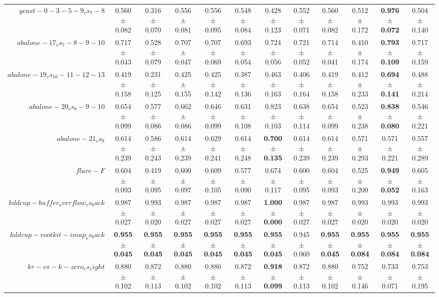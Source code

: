 \begin{table}[!ht]
{\begin{tabular}{r c c c c c c c c c c c}
$yeast-0-3-5-9_vs_7-8$ & 0.560 $\pm$ 0.082 & 0.316 $\pm$ 0.070 & 0.556 $\pm$ 0.081 & 0.556 $\pm$ 0.095 & 0.548 $\pm$ 0.084 & 0.428 $\pm$ 0.123 & 0.552 $\pm$ 0.071 & 0.560 $\pm$ 0.082 & 0.512 $\pm$ 0.172 & \textbf{0.976 $\pm$ 0.072} & 0.504 $\pm$ 0.140 \\
$abalone-17_vs_7-8-9-10$ & 0.717 $\pm$ 0.043 & 0.528 $\pm$ 0.079 & 0.707 $\pm$ 0.047 & 0.707 $\pm$ 0.069 & 0.693 $\pm$ 0.054 & 0.724 $\pm$ 0.056 & 0.721 $\pm$ 0.052 & 0.714 $\pm$ 0.041 & 0.410 $\pm$ 0.174 & \textbf{0.793 $\pm$ 0.109} & 0.717 $\pm$ 0.159 \\
$abalone-19_vs_10-11-12-13$ & 0.419 $\pm$ 0.158 & 0.231 $\pm$ 0.125 & 0.425 $\pm$ 0.155 & 0.425 $\pm$ 0.142 & 0.387 $\pm$ 0.136 & 0.463 $\pm$ 0.163 & 0.406 $\pm$ 0.164 & 0.419 $\pm$ 0.158 & 0.412 $\pm$ 0.233 & \textbf{0.694 $\pm$ 0.141} & 0.488 $\pm$ 0.214 \\
$abalone-20_vs_8-9-10$ & 0.654 $\pm$ 0.099 & 0.577 $\pm$ 0.086 & 0.662 $\pm$ 0.086 & 0.646 $\pm$ 0.099 & 0.631 $\pm$ 0.108 & 0.823 $\pm$ 0.103 & 0.638 $\pm$ 0.114 & 0.654 $\pm$ 0.099 & 0.523 $\pm$ 0.238 & \textbf{0.838 $\pm$ 0.080} & 0.546 $\pm$ 0.221 \\
$abalone-21_vs_8$ & 0.614 $\pm$ 0.239 & 0.586 $\pm$ 0.243 & 0.614 $\pm$ 0.239 & 0.629 $\pm$ 0.241 & 0.614 $\pm$ 0.248 & \textbf{0.700 $\pm$ 0.135} & 0.614 $\pm$ 0.239 & 0.614 $\pm$ 0.239 & 0.571 $\pm$ 0.293 & 0.571 $\pm$ 0.221 & 0.557 $\pm$ 0.289 \\
$flare-F$ & 0.604 $\pm$ 0.093 & 0.419 $\pm$ 0.095 & 0.600 $\pm$ 0.097 & 0.609 $\pm$ 0.105 & 0.577 $\pm$ 0.090 & 0.674 $\pm$ 0.117 & 0.600 $\pm$ 0.095 & 0.604 $\pm$ 0.093 & 0.525 $\pm$ 0.200 & \textbf{0.949 $\pm$ 0.052} & 0.605 $\pm$ 0.163 \\
$kddcup-buffer_overflow_vs_back$ & 0.987 $\pm$ 0.027 & 0.993 $\pm$ 0.020 & 0.987 $\pm$ 0.027 & 0.987 $\pm$ 0.027 & 0.987 $\pm$ 0.027 & \textbf{1.000 $\pm$ 0.000} & 0.987 $\pm$ 0.027 & 0.987 $\pm$ 0.027 & 0.993 $\pm$ 0.020 & 0.993 $\pm$ 0.020 & 0.993 $\pm$ 0.020 \\
$kddcup-rootkit-imap_vs_back$ & \textbf{0.955 $\pm$ 0.045} & \textbf{0.955 $\pm$ 0.045} & \textbf{0.955 $\pm$ 0.045} & \textbf{0.955 $\pm$ 0.045} & \textbf{0.955 $\pm$ 0.045} & \textbf{0.955 $\pm$ 0.045} & 0.945 $\pm$ 0.060 & \textbf{0.955 $\pm$ 0.045} & \textbf{0.955 $\pm$ 0.084} & \textbf{0.955 $\pm$ 0.084} & \textbf{0.955 $\pm$ 0.084} \\
$kr-vs-k-zero_vs_eight$ & 0.880 $\pm$ 0.102 & 0.872 $\pm$ 0.113 & 0.880 $\pm$ 0.102 & 0.880 $\pm$ 0.102 & 0.872 $\pm$ 0.113 & \textbf{0.918 $\pm$ 0.099} & 0.872 $\pm$ 0.113 & 0.880 $\pm$ 0.102 & 0.752 $\pm$ 0.146 & 0.733 $\pm$ 0.071 & 0.753 $\pm$ 0.195 \\

\end{tabular}}
\end{table}
